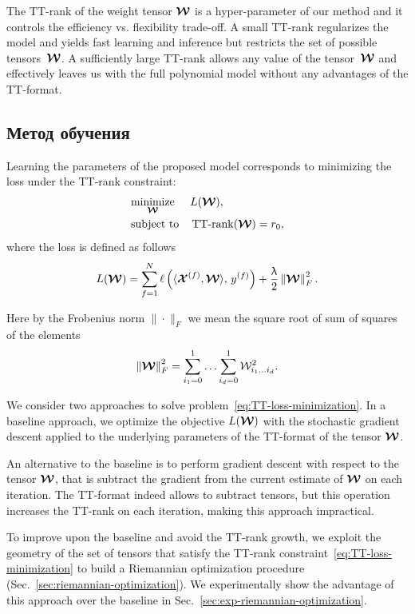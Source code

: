 The TT-rank of the weight tensor $\boldsymbol{\mathcal{W}}$ is a hyper-parameter of our method and it controls the efficiency vs. flexibility trade-off.
A small TT-rank regularizes the model and yields fast learning and inference but restricts the set of possible tensors~$\boldsymbol{\mathcal{W}}$.
A sufficiently large TT-rank allows any value of the tensor~$\boldsymbol{\mathcal{W}}$ and effectively leaves us with the full polynomial model without any advantages of the TT-format.

\subsection{Метод обучения}
Learning the parameters of the proposed model corresponds to minimizing the loss under the TT-rank constraint:
\begin{equation}
\label{eq:TT-loss-minimization}
\begin{aligned}
& \underset{\boldsymbol{\mathcal{W}}}{\text{minimize}}
& & L(\boldsymbol{\mathcal{W}}), \\
& \text{subject to}
& & \operatorname{TT-rank}(\boldsymbol{\mathcal{W}}) = r_0,
\end{aligned}
\end{equation}
where the loss is defined as follows
\begin{equation}
\label{eq:TT-loss}
L(\boldsymbol{\mathcal{W}}) = \sum_{f=1}^N \ell\left(\langle \boldsymbol{\mathcal{X}}^{(f)}, \boldsymbol{\mathcal{W}} \rangle,\, y^{(f)}\right) + \frac{\uplambda}{2} \left\lVert\boldsymbol{\mathcal{W}}\right\rVert^2_F.
\end{equation}

Here by the Frobenius norm $\| \cdot \|_F$ we mean the square root of sum of squares of the elements
\begin{equation*}
\left\lVert\boldsymbol{\mathcal{W}}\right\rVert^2_F = \sum_{i_1=0}^1 \ldots \sum_{i_d=0}^1 \mathcal{W}^2_{i_1 \ldots i_d}.
\end{equation*}

We consider two approaches to solve problem~\eqref{eq:TT-loss-minimization}.
In a baseline approach, we optimize the objective $L(\boldsymbol{\mathcal{W}})$ with the stochastic gradient descent applied to the underlying parameters of the TT-format of the tensor $\boldsymbol{\mathcal{W}}$.

An alternative to the baseline is to perform gradient descent with respect to the tensor $\boldsymbol{\mathcal{W}}$, that is subtract the  gradient from the current estimate of $\boldsymbol{\mathcal{W}}$ on each iteration.
The TT-format indeed allows to subtract tensors, but this operation increases the TT-rank on each iteration, making this approach impractical.

To improve upon the baseline and avoid the TT-rank growth, we exploit the geometry of the set of tensors that satisfy the TT-rank constraint~\eqref{eq:TT-loss-minimization} to build a Riemannian optimization procedure (Sec.~\ref{sec:riemannian-optimization}).
We experimentally show the advantage of this approach over the baseline in Sec.~\ref{sec:exp-riemannian-optimization}.

